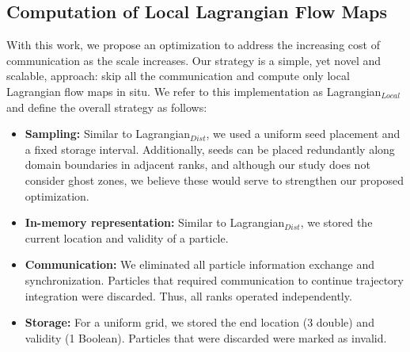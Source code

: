 \subsection{Computation of Local Lagrangian Flow Maps}
\label{sec:local}
%
%
%
%
%
With this work, we propose an optimization to address the increasing cost of communication as the scale increases.
%
Our strategy is a simple, yet novel and scalable, approach: skip all the communication and compute only local Lagrangian flow maps in situ. 
%
We refer to this implementation as Lagrangian$_{Local}$ and define the overall strategy as follows:
\begin{itemize}[leftmargin=*]
\item\textbf{Sampling:} Similar to Lagrangian$_{Dist}$, we used a uniform seed placement and a fixed storage interval.
%
Additionally, seeds can be placed redundantly along domain boundaries in adjacent ranks, and although our study does not consider ghost zones, we believe these would serve to strengthen our proposed optimization.
%
\item\textbf{In-memory representation:} Similar to Lagrangian$_{Dist}$, we stored the current location and validity of a particle.
%
\item\textbf{Communication:} We eliminated all particle information exchange and synchronization. Particles that required communication to continue trajectory integration were discarded. Thus, all ranks operated independently.
%
\item\textbf{Storage:} For a uniform grid, we stored the end location (3 double) and validity (1 Boolean). Particles that were discarded were marked as invalid. 
%
\end{itemize}


